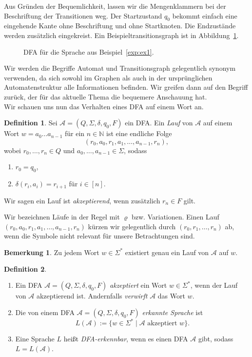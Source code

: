 \documentclass[11pt, a4paper]{article}
\theoremstyle{definition}
\newtheorem{definition}{Definition}[section]
\newtheorem*{remark*}{Bemerkung}
\theoremstyle{plain}
\numberwithin{equation}{section}
\begin{document}
Aus Gründen der Bequemlichkeit, lassen wir die Mengenklammern bei der Beschriftung der Transitionen weg. Der Startzustand \( q_0 \) bekommt einfach eine eingehende Kante ohne Beschriftung und ohne Startknoten. Die Endzustände werden zusätzlich eingekreist. Ein Beispieltransitionsgraph ist in Abbildung~\ref{fig:dfa_ex1}.
\begin{figure}
	\centering
	
	\caption{DFA für die Sprache aus Beispiel~\ref{exp:ex1}.}
	\label{fig:dfa_ex1}
\end{figure}
Wir werden die Begriffe Automat und Transitionsgraph gelegentlich synonym verwenden, da sich sowohl im Graphen als auch in der ursprünglichen Automatenstruktur alle Informationen befinden. Wir greifen dann auf den Begriff zurück, der für das aktuelle Thema die bequemere Anschauung hat.\\
Wir schauen uns nun das Verhalten eines DFA auf einem Wort an.
\begin{definition}
	Sei \( \mathcal{A} = (Q, \Sigma, \delta, q_0, F) \) ein DFA.
	Ein \textit{Lauf} von \( \mathcal{A} \) auf einem Wort \( w = a_0 \ldots a_{n-1} \) für ein \( n \in \mathbb{N} \) ist eine endliche Folge
	\[
		(r_0, a_0, r_1, a_1, \ldots, a_{n-1}, r_n),
	\]
	wobei \( r_0, \ldots, r_n \in Q \) und \( a_0, \ldots, a_{n-1} \in \Sigma \), sodass
	\begin{enumerate}
		\item \( r_0 = q_0 \),
		\item \( \delta(r_i, a_i) = r_{i+1} \) für \( i \in [n] \).
	\end{enumerate}
	Wir sagen ein Lauf ist \textit{akzeptierend}, wenn zusätzlich \( r_n \in F \) gilt.
\end{definition}
Wir bezeichnen Läufe in der Regel mit \( \varrho \) bzw. Variationen. Einen Lauf \( (r_0, a_0, r_1, a_1, \ldots, a_{n-1}, r_n) \) kürzen wir gelegentlich durch \( (r_0, r_1, \ldots, r_n) \) ab, wenn die Symbole nicht relevant für unsere Betrachtungen sind.
\begin{remark*}
	Zu jedem Wort \( w \in \Sigma^\ast \) existiert genau ein Lauf von \( \mathcal{A} \) auf \( w \).
\end{remark*}
\begin{definition}
\
	\begin{enumerate}
		\item Ein DFA \( \mathcal{A} = (Q, \Sigma, \delta, q_0, F) \) \textit{akzeptiert} ein Wort \( w \in \Sigma^\ast \), wenn der Lauf von \( \mathcal{A} \) akzeptierend ist. Andernfalls \textit{verwirft} \( \mathcal{A} \) das Wort \( w \).
		\item Die von einem DFA \( \mathcal{A} = (Q, \Sigma, \delta, q_0, F) \) \textit{erkannte Sprache} ist
			\[
				L(\mathcal{A}) := \{ w \in \Sigma^\ast \mid \mathcal{A} \text{ akzeptiert } w \}.
			\]
		\item Eine Sprache \( L \) heißt \textit{DFA-erkennbar}, wenn es einen DFA \( \mathcal{A} \) gibt, sodass \( L = L(\mathcal{A}) \).
	\end{enumerate}
\end{definition}
\end{document}
